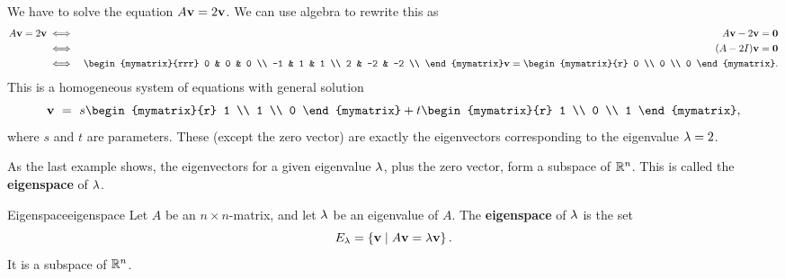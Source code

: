 \begin{solution}
  We have to solve the equation $A\mbox{\bf v}=2\mbox{\bf v}$. We can use
  algebra to rewrite this as
  \begin{eqnarray*}
    A\vect{v} = 2\vect{v}
    &\iff& A\vect{v} - 2\vect{v} = \vect{0} \\
    &\iff& (A-2I)\vect{v} = \vect{0} \\
    &\iff& \begin{mymatrix}{rrr}
      0  &  0 & 0 \\
      -1 &  1 & 1 \\
      2  & -2 & -2 \\
    \end{mymatrix}\vect{v}
    = \begin{mymatrix}{r} 0 \\ 0 \\ 0 \end{mymatrix}.
  \end{eqnarray*}
  This is a homogeneous system of equations with general
  solution
  \begin{equation*}
    \vect{v}
    ~=~ s \begin{mymatrix}{r} 1 \\ 1 \\ 0 \end{mymatrix}
    + t \begin{mymatrix}{r} 1 \\ 0 \\ 1 \end{mymatrix},
  \end{equation*}
  where $s$ and $t$ are parameters. These (except the zero vector) are
  exactly the eigenvectors corresponding to the eigenvalue $\lambda = 2$.
\end{solution}

As the last example shows, the eigenvectors for a given eigenvalue
$\lambda$, plus the zero vector, form a subspace of $\mathbb{R}^n$. This is
called the \textbf{eigenspace} of $\lambda$.

\begin{definition}{Eigenspace}{eigenspace}
  Let $A$ be an $n\times n$-matrix, and let $\lambda$ be an eigenvalue
  of $A$. The \textbf{eigenspace}%
   of $\lambda$ is the set
  \begin{equation*}
    E_{\lambda} = \left\{\mbox{\bf v} \mid A\mbox{\bf v}=\lambda\mbox{\bf v}\right\}.
  \end{equation*}
  It is a subspace of $\mathbb{R}^n$.
\end{definition}

